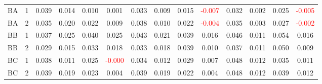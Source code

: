\begin{table}[!htb]
{\begin{tabular}{llcccccccccccc}
BA & 1 & 0.039 & 0.014 & 0.010 & 0.001 & 0.033 & 0.009 & 0.015 & \textcolor{red}{-0.007} & 0.032 & 0.002 & 0.025 & \textcolor{red}{-0.005}\\
BA & 2 & 0.035 & 0.020 & 0.022 & 0.009 & 0.038 & 0.010 & 0.022 & \textcolor{red}{-0.004} & 0.035 & 0.003 & 0.027 & \textcolor{red}{-0.002}\\
BB & 1 & 0.037 & 0.025 & 0.040 & 0.025 & 0.043 & 0.021 & 0.039 & 0.016 & 0.046 & 0.011 & 0.054 & 0.016\\
BB & 2 & 0.029 & 0.015 & 0.033 & 0.018 & 0.033 & 0.018 & 0.039 & 0.010 & 0.037 & 0.011 & 0.050 & 0.009\\
BC & 1 & 0.038 & 0.011 & 0.025 & \textcolor{red}{-0.000} & 0.034 & 0.012 & 0.029 & 0.007 & 0.048 & 0.012 & 0.035 & 0.011\\
BC & 2 & 0.039 & 0.019 & 0.023 & 0.004 & 0.039 & 0.019 & 0.022 & 0.004 & 0.048 & 0.012 & 0.039 & 0.012\\
\hline
    \end{tabular}%
    }
\end{table}

